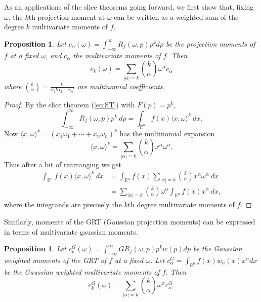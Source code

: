 \documentclass{amsart}
\newtheorem{proposition}[theorem]{Proposition}
\theoremstyle{remark}
\numberwithin{equation}{section}
\newcommand{\RR}{\mathbb{R}}
\begin{document}
As an applications of the slice theorems going forward, we first show that, fixing $\omega$, the $k$th projection moment at $\omega$ can be written as a weighted sum of the degree $k$ multivariate moments of $f$. 
\begin{proposition}
    Let $c_\alpha (\omega) = \int_{-\infty}^\infty R_f(\omega, p) p^k dp$ be the projection moments of $f$ at a fixed $\omega$, and $c_\alpha$ the multivariate moments of $f$. Then
    \[
        c_k(\omega) = \sum_{|\alpha| = k}\binom{k}{\alpha} \omega^\alpha c_\alpha
    \]
    where $\binom{k}{\alpha} = \frac{k!}{\alpha_1! \alpha_2! \cdots \alpha_n!}$ are multinomial coefficients.
\end{proposition}
\begin{proof}
By the slice theorem (\ref{eq:ST}) with $F(p) = p^k$,
\[
    \int_{-\infty}^\infty R_f(\omega, p) p^k ~dp 
    = \int_{\RR^n} f(x) \langle x, \omega \rangle^k ~dx.
\]
Now $\langle x, \omega \rangle^k = {(x_1 \omega_1 + \cdots + x_n \omega_n)}^k$ has the multinomial expansion
\[
    \langle x, \omega \rangle^k = \sum_{|\alpha| = k}\binom{k}{\alpha} x^\alpha\omega^\alpha.
\]
Thus after a bit of rearranging we get
\begin{align*}
    \int_{\RR^n} f(x) \langle x, \omega \rangle^k ~dx
    &= \int_{\RR^n} f(x) \sum_{|\alpha| = k}\binom{k}{\alpha} x^\alpha \omega^\alpha ~dx \\
    &= \sum_{|\alpha| = k}\binom{k}{\alpha} \omega^\alpha \int_{\RR^n} f(x) x^\alpha ~dx,
\end{align*}
where the integrands are precisely the $k$th degree multivariate moments of $f$.
\end{proof}
Similarly, moments of the GRT (Gaussian projection moments) can be expressed in terms of multivariate gaussian moments.
\begin{proposition}
Let $c_k^G(\omega) = \int_{-\infty}^\infty GR_f(\omega, p) p^k w(p) dp$ be the Gaussian weighted moments of the GRT of $f$ at a fixed $\omega$. Let $c^G_\alpha = \int_{\RR^n} f(x) w_n(x) x^\alpha dx$ be the Gaussian weighted multivariate moments of $f$. Then
\[
    c^G_k(\omega) = \sum_{|\alpha| = k}\binom{k}{\alpha} \omega^\alpha c^G_\alpha.
\]
\end{proposition}
\end{document}
